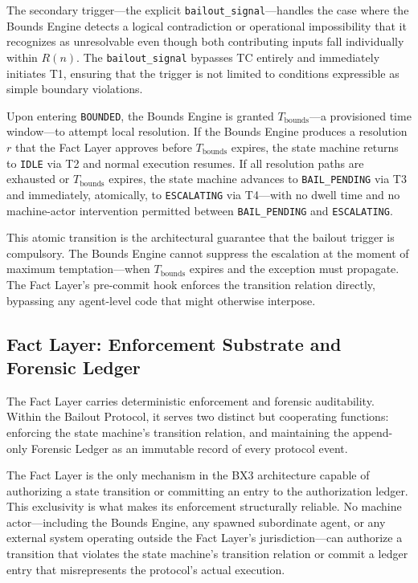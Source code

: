 The secondary trigger---the explicit \texttt{bailout\_signal}---handles the case where the Bounds Engine detects a logical contradiction or operational impossibility that it recognizes as unresolvable even though both contributing inputs fall individually within $R(n)$. The \texttt{bailout\_signal} bypasses TC entirely and immediately initiates T1, ensuring that the trigger is not limited to conditions expressible as simple boundary violations.

Upon entering \texttt{BOUNDED}, the Bounds Engine is granted $T_{\mathrm{bounds}}$---a provisioned time window---to attempt local resolution. If the Bounds Engine produces a resolution $r$ that the Fact Layer approves before $T_{\mathrm{bounds}}$ expires, the state machine returns to \texttt{IDLE} via T2 and normal execution resumes. If all resolution paths are exhausted or $T_{\mathrm{bounds}}$ expires, the state machine advances to \texttt{BAIL\_PENDING} via T3 and immediately, atomically, to \texttt{ESCALATING} via T4---with no dwell time and no machine-actor intervention permitted between \texttt{BAIL\_PENDING} and \texttt{ESCALATING}.

This atomic transition is the architectural guarantee that the bailout trigger is compulsory. The Bounds Engine cannot suppress the escalation at the moment of maximum temptation---when $T_{\mathrm{bounds}}$ expires and the exception must propagate. The Fact Layer's pre-commit hook enforces the transition relation directly, bypassing any agent-level code that might otherwise interpose.

\subsection{Fact Layer: Enforcement Substrate and Forensic Ledger}
\label{sec:fact-layer}

The Fact Layer carries deterministic enforcement and forensic auditability. Within the Bailout Protocol, it serves two distinct but cooperating functions: enforcing the state machine's transition relation, and maintaining the append-only Forensic Ledger as an immutable record of every protocol event.

The Fact Layer is the only mechanism in the BX3 architecture capable of authorizing a state transition or committing an entry to the authorization ledger. This exclusivity is what makes its enforcement structurally reliable. No machine actor---including the Bounds Engine, any spawned subordinate agent, or any external system operating outside the Fact Layer's jurisdiction---can authorize a transition that violates the state machine's transition relation or commit a ledger entry that misrepresents the protocol's actual execution.

